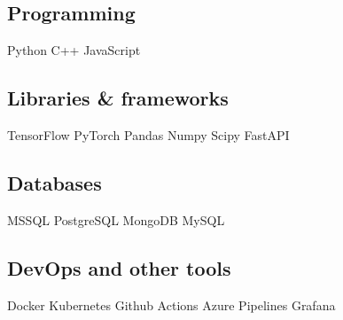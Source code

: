 \begin{minipage}[t]{.6\textwidth}
    \subsection{Programming}
    Python \textbullet{}   C++ \textbullet{} JavaScript
    \subsection{Libraries \& frameworks}
    TensorFlow \textbullet{} PyTorch \textbullet{} Pandas \textbullet{} Numpy \textbullet{} Scipy \textbullet{} FastAPI
    \subsection{Databases}
    MSSQL \textbullet{} PostgreSQL \textbullet{} MongoDB \textbullet{} MySQL
    \subsection{DevOps and other tools}
    Docker \textbullet{} Kubernetes \textbullet{} Github Actions \textbullet{} Azure Pipelines \textbullet{} Grafana
    \sectionsep
    \end{minipage}